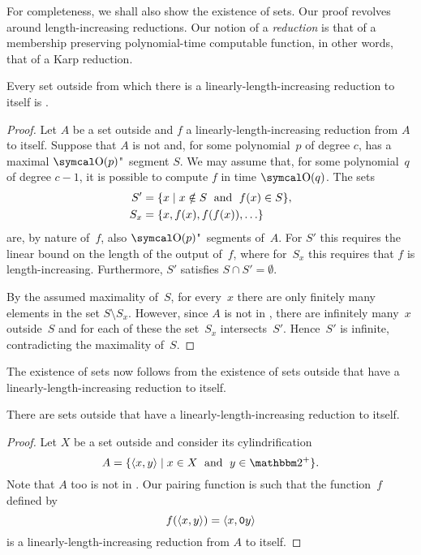 For completeness, we shall also show the existence of  sets.
Our proof revolves around length-increasing reductions.
Our notion of a \emph{reduction} is that of a membership preserving polynomial-time computable function, in other words, that of a Karp reduction.
\begin{theorem}
  Every set outside  from which there is a linearly-length-increasing reduction to itself is .
\end{theorem}
\begin{proof}
  Let $A$ be a set outside  and $f$ a linearly-length-increasing reduction from $A$ to itself.
  Suppose that $A$ is not  and, for some polynomial~$p$ of degree $c$, has a maximal $\bigO(p)$"~segment $S$.
  We may assume that, for some polynomial~$q$ of degree $c - 1$, it is possible to compute $f$ in time $\bigO(q)$.
  The sets
  \begin{align*}
    S' &= \{x \;|\; x \notin S \;\text{ and }\; f(x) \in S\}, \\
    S_x &= \{x, f(x), f(f(x)), \ldots\}
  \end{align*}
  are, by nature of~$f$, also $\bigO(p)$"~segments of~$A$.
  For $S'$ this requires the linear bound on the length of the output of~$f$, where for~$S_x$ this requires that $f$ is length-increasing.
  Furthermore, $S'$ satisfies $S \cap S' = \emptyset$.

  By the assumed maximality of~$S$, for every~$x$ there are only finitely many elements in the set $S \setminus S_x$.
  However, since $A$ is not in , there are infinitely many~$x$ outside~$S$ and for each of these the set~$S_x$ intersects~$S'$.
  Hence~$S'$ is infinite, contradicting the maximality of~$S$.
\end{proof}

The existence of  sets now follows from the existence of sets outside  that have a linearly-length-increasing reduction to itself.
\begin{lemma}
  There are sets outside  that have a linearly-length-increasing reduction to itself.
\end{lemma}
\begin{proof}
  Let $X$ be a set outside  and consider its cylindrification \parencite{balcazar1990structural}
  \begin{equation*}
    A \deq \{\pair{x}{y} \st x \in X \reland y \in \binary^+\}.
  \end{equation*}
  Note that $A$ too is not in .
  Our pairing function is such that the function~$f$ defined by
  \begin{equation*}
    f({\langle x, y\rangle}) = {\langle x, \textnormal{\texttt{0}}y\rangle}
  \end{equation*}
  is a linearly-length-increasing reduction from $A$ to itself.
\end{proof}


